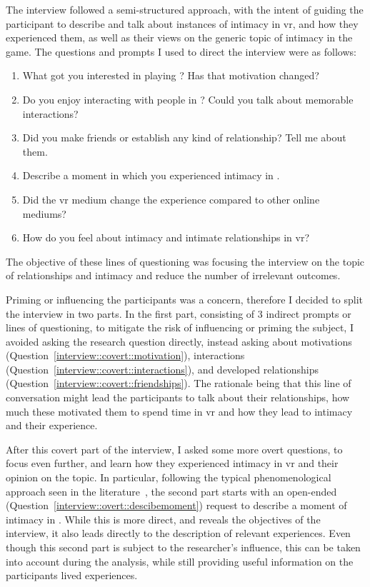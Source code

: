 The interview followed a semi-structured approach, with the intent of guiding the participant to describe and talk about instances of intimacy in \gls{vr}, and how they experienced them, as well as their views on the generic topic of intimacy in the game. The questions and prompts I used to direct the interview were as follows:
\begin{enumerate}
	\item\label{interview::covert::motivation} What got you interested in playing \vrc? Has that motivation changed?
	\item\label{interview::covert::interactions} Do you enjoy interacting with people in \vrc? Could you talk about memorable interactions? 
	\item\label{interview::covert::friendships} Did you make friends or establish any kind of relationship? Tell me about them.
	\item\label{interview::overt::descibemoment} Describe a moment in which you experienced intimacy in \vrc.
	\item\label{interview::overt::vrvsonline} Did the \gls{vr} medium change the experience compared to other online mediums? 
	\item\label{interview::overt::feelaboutintimacy} How do you feel about intimacy and intimate relationships in \gls{vr}?
\end{enumerate}

The objective of these lines of questioning was focusing the interview on the topic of relationships and intimacy and reduce the number of irrelevant outcomes.

Priming or influencing the participants was a concern, therefore I decided to split the interview in two parts.
In the first part, consisting of $3$ indirect prompts or lines of questioning, to mitigate the risk of influencing or priming the subject, I avoided asking the research question directly, instead asking about motivations (Question~\ref{interview::covert::motivation}), interactions (Question~\ref{interview::covert::interactions}), and developed relationships (Question~\ref{interview::covert::friendships}).
The rationale being that this line of conversation might lead the participants to talk about their relationships, how much these motivated them to spend time in \gls{vr} and how they lead to intimacy and their experience.

After this covert part of the interview, I asked some more overt questions, to focus even further, and learn how they experienced intimacy in \gls{vr} and their opinion on the topic.
In particular, following the typical phenomenological approach seen in the literature~\cite{register92}, the second part starts with an open-ended (Question~\ref{interview::overt::descibemoment}) request to describe a moment of intimacy in \vrc. 
While this is more direct, and reveals the objectives of the interview, it also leads directly to the description of relevant experiences.
Even though this second part is subject to the researcher's influence, this can be taken into account during the analysis, while still providing useful information on the participants lived experiences.


